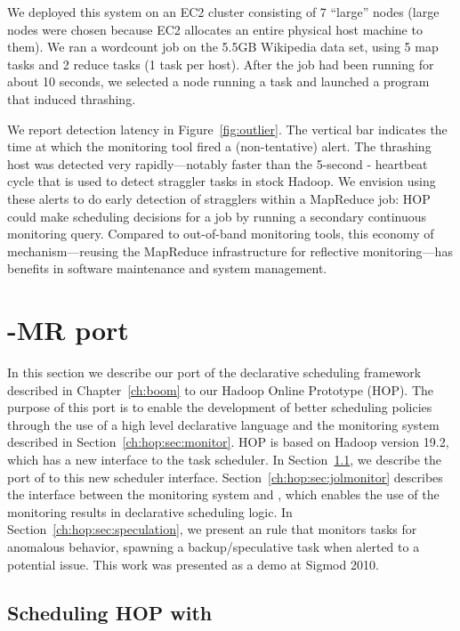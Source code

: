 We deployed this system on an EC2 cluster consisting of 7 ``large''
nodes (large nodes were chosen because EC2 allocates an entire
physical host machine to them). We ran a wordcount job on the 5.5GB Wikipedia
data set, using 5 map tasks and 2 reduce tasks (1 task per host). After
the job had been running for about 10 seconds, we selected a node
running a task and launched a program that induced thrashing.

We report detection latency in Figure~\ref{fig:outlier}. The vertical bar
indicates the time at which the monitoring tool fired a (non-tentative)
alert. The thrashing host was detected very rapidly---notably faster than the
5-second {\TT}-{\JT} heartbeat cycle that is used to detect straggler tasks in
stock Hadoop. We envision using these alerts to do early detection of stragglers
within a MapReduce job: HOP could make scheduling decisions for a job by running
a secondary continuous monitoring query. Compared to out-of-band monitoring
tools, this economy of mechanism---reusing the MapReduce infrastructure for
reflective monitoring---has benefits in software maintenance and system
management.

\section{\BOOM-MR port}
\label{ch:hop:sec:boom}

In this section we describe our port of the declarative scheduling framework
described in Chapter~\ref{ch:boom} to our Hadoop Online Prototype (HOP). The purpose
of this port is to enable the development of better scheduling policies through the use of a high level
declarative language and the monitoring system described in Section~\ref{ch:hop:sec:monitor}. HOP is
based on Hadoop version 19.2, which has a new interface to the task scheduler.
In Section~\ref{ch:hop:sec:jolport}, we describe the port of \JOL to this new scheduler interface. 
Section~\ref{ch:hop:sec:jolmonitor} describes the interface between the monitoring system and \JOL, 
which enables the use of the monitoring results in declarative scheduling logic. 
In Section~\ref{ch:hop:sec:speculation}, we present an \OVERLOG rule that monitors tasks for anomalous behavior, spawning
a backup/speculative task when alerted to a potential issue. This work was presented as a demo at Sigmod 2010.

\subsection{Scheduling HOP with \JOL}
\label{ch:hop:sec:jolport}

